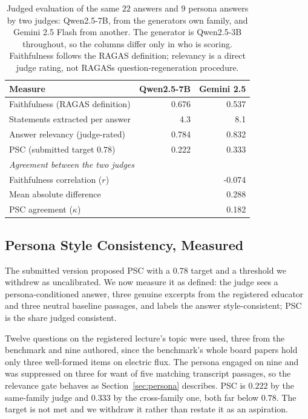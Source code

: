 \documentclass[conference]{IEEEtran}
\begin{document}
\begin{table}[htbp]
\caption{Judged evaluation of the same $22$ answers and $9$ persona answers by two judges: Qwen2.5-7B, from the generator\textquotesingle{}s own family, and Gemini 2.5 Flash from another. The generator is Qwen2.5-3B throughout, so the columns differ only in who is scoring. Faithfulness follows the RAGAS definition; relevancy is a direct judge rating, not RAGAS\textquotesingle{}s question-regeneration procedure.}
\label{tab:judged}
\centering
\begin{tabular}{lrr}
\toprule
\textbf{Measure} & \textbf{Qwen2.5-7B} & \textbf{Gemini 2.5} \\
\midrule
Faithfulness (RAGAS definition) & 0.676 & 0.537 \\
Statements extracted per answer & 4.3 & 8.1 \\
Answer relevancy (judge-rated) & 0.784 & 0.832 \\
PSC (submitted target $0.78$) & 0.222 & 0.333 \\
\midrule
\multicolumn{3}{l}{\emph{Agreement between the two judges}} \\
Faithfulness correlation ($r$) & \multicolumn{2}{r}{-0.074} \\
Mean absolute difference & \multicolumn{2}{r}{0.288} \\
PSC agreement ($\kappa$) & \multicolumn{2}{r}{0.182} \\
\bottomrule
\end{tabular}
\end{table}

\subsection{Persona Style Consistency, Measured}
\label{sec:pscval}
The submitted version proposed PSC with a $0.78$ target and a threshold we
withdrew as uncalibrated. We now measure it as defined: the judge sees a
persona-conditioned answer, three genuine excerpts from the registered educator
and three neutral baseline passages, and labels the answer style-consistent;
PSC is the share judged consistent.

Twelve questions on the registered lecture's topic were used, three from the
benchmark and nine authored, since the benchmark's whole board papers hold only
three well-formed items on electric flux. The persona engaged on nine and was
suppressed on three for want of five matching transcript passages, so the
relevance gate behaves as Section~\ref{sec:persona} describes. PSC is $0.222$
by the same-family judge and $0.333$ by the cross-family one, both far below
$0.78$. The target is not met and we withdraw it rather than restate it as an
aspiration.
\end{document}

